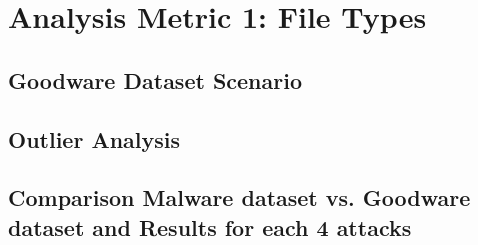 \newpage

\section{Analysis Metric 1: File Types}
\label{sec:analysisFileTypes}

\subsection{Goodware Dataset Scenario}
\label{sec:goodwareFileTypes}


\subsection{Outlier Analysis}
\label{sec:outlierFileTypes}



\subsection{Comparison Malware dataset vs. Goodware dataset and Results for each 4 attacks}




\newpage

